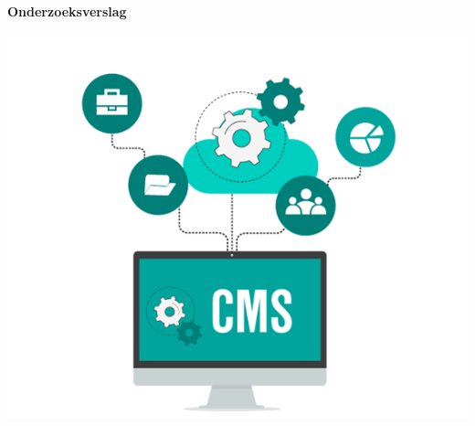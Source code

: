 \begin{titlepage}
   \begin{center}
       \vspace*{1cm}

		\Huge
		\textbf{Onderzoeksverslag}

		\vspace{0.5cm}
		
		\LARGE
		\ProjectName
            
		\vspace{1.5cm}

		\textbf{\StudentName}

		\vspace{3.0cm}
		
		\includegraphics[width=1\textwidth]{img/cmsheader.png}
   \end{center}
\end{titlepage}

